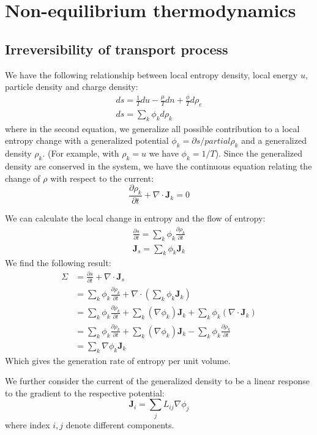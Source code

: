 \documentclass{article}
\newcommand{\pfrac}[2]{\frac{\partial #1}{\partial #2}}
\begin{document}
\section{Non-equilibrium thermodynamics}
\subsection{Irreversibility of transport process}
We have the following relationship between local entropy density, local energy $u$, particle density and 
charge density:
\begin{gather}
    ds = \frac{1}{T} du - \frac{\mu}{T} dn + \frac{\phi}{T} d\rho_e \\
    ds = \sum_k \phi_k d\rho_k
\end{gather}
where in the second equation, we generalize all possible contribution to a local entropy change 
with a generalized potential $\phi_k = \partial s / partial \rho_k$ and a generalized density $\rho_k$. 
(For example, with $\rho_k = u$ we have $\phi_k = 1/T$). 
Since the generalized density are conserved in the system, we have the continuous equation relating the 
change of $\rho$ with respect to the current:
\begin{equation}
    \pfrac{\rho_k}{t} + \nabla \cdot \mathbf{J}_{k} = 0
\end{equation}

We can calculate the local change in entropy and the flow of entropy:
\begin{gather}
    \pfrac{s}{t} = \sum_k \phi_k \pfrac{\rho_k}{t} \\
    \mathbf{J}_s = \sum_k \phi_k \mathbf{J}_{k}
\end{gather}
We find the following result:
\begin{align}
    \Sigma &= \pfrac{s}{t} +\nabla \cdot  \mathbf{J}_s \\
    & = \sum_k \phi_k \pfrac{\rho_k}{t} + \nabla \cdot \left(\sum_k \phi_k \mathbf{J}_{k} \right)\\
    & = \sum_k \phi_k \pfrac{\rho_k}{t} + \sum_k (\nabla  \phi_k) \mathbf{J}_{k} + \sum_k \phi_k (\nabla \cdot \mathbf{J}_{k}) \\
    & = \sum_k \phi_k \pfrac{\rho_k}{t} + \sum_k (\nabla  \phi_k) \mathbf{J}_{k} - \sum_k \phi_k \pfrac{\rho_k}{t} \\
    & = \sum_k \nabla \phi_k \mathbf{J}_{k}
\end{align}
Which gives the generation rate of entropy per unit volume.

We further consider the current of the generalized density to be a linear response to the 
gradient to the respective potential:
\begin{equation}
    \mathbf{J}_i = \sum_j L_{ij} \nabla \phi_j \label{linearresponse}
\end{equation}
where index $i,j$ denote different components.
\end{document}
